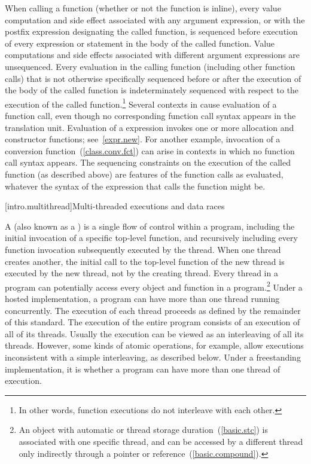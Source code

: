 When calling a function (whether or not the function is inline), every
%
value computation and
%
side effect associated with any argument
expression, or with the postfix expression designating the called
function, is sequenced before execution of every expression or statement
in the body of the called function. \enternote
Value computations and
side effects associated with different argument expressions are
unsequenced. \exitnote Every evaluation in the calling function
(including other function calls) that is not otherwise specifically
sequenced before or after the execution of the body of the called
function is indeterminately sequenced with respect to the execution of
the called function.\footnote{In other words, function executions do not interleave with
each other.}
Several contexts in \Cpp  cause evaluation of a function call, even
though no corresponding function call syntax appears in the translation
unit.
\enterexample
Evaluation of a  expression invokes one or more allocation
and constructor functions; see~\ref{expr.new}. For another example,
invocation of a conversion function~(\ref{class.conv.fct}) can arise in
contexts in which no function call syntax appears.
\exitexample
The sequencing constraints on the execution of the called function (as
described above) are features of the function calls as evaluated,
whatever the syntax of the expression that calls the function might be.%
%

[intro.multithread]{Multi-threaded executions and data races}

\pnum
{}%
%
A  (also known as a ) is a single flow of
control within a program, including the initial invocation of a specific
top-level function, and recursively including every function invocation
subsequently executed by the thread. \enternote When one thread creates another,
the initial call to the top-level function of the new thread is executed by the
new thread, not by the creating thread. \exitnote Every thread in a program can
potentially access every object and function in a program.\footnote{An object
with automatic or thread storage duration~(\ref{basic.stc}) is associated with
one specific thread, and can be accessed by a different thread only indirectly
through a pointer or reference~(\ref{basic.compound}).} Under a hosted
implementation, a \Cpp program can have more than one thread running
concurrently. The execution of each thread proceeds as defined by the remainder
of this standard. The execution of the entire program consists of an execution
of all of its threads. \enternote Usually the execution can be viewed as an
interleaving of all its threads. However, some kinds of atomic operations, for
example, allow executions inconsistent with a simple interleaving, as described
below. \exitnote Under a freestanding implementation, it is  whether a program can
have more than one thread of execution.

